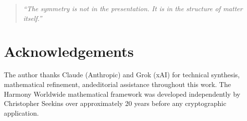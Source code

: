 \documentclass[preprint]{iacrtrans}
\begin{document}
\begin{quote}
\itshape
``The symmetry is not in the presentation.
It is in the structure of matter itself.''
\end{quote}

\section*{Acknowledgements}

The author thanks Claude (Anthropic) and Grok (xAI) for technical synthesis, mathematical refinement, andeditorial assistance throughout this work. 
The Harmony Worldwide mathematical framework was developed
independently by Christopher Seekins over approximately 20 years before any
cryptographic application.



\end{document}
